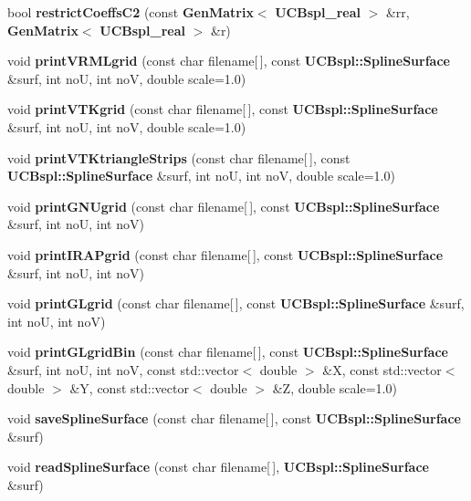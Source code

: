 \begin{DoxyCompactItemize}
\item 
bool {\bfseries restrictCoeffsC2} (const {\bf GenMatrix}$<$ {\bf UCBspl\_\-real} $>$ \&rr, {\bf GenMatrix}$<$ {\bf UCBspl\_\-real} $>$ \&r)\label{namespaceUCBspl_ae8accf3f9377f4347fe10f80c32b90be}

\item 
void {\bfseries printVRMLgrid} (const char filename[$\,$], const {\bf UCBspl::SplineSurface} \&surf, int noU, int noV, double scale=1.0)\label{namespaceUCBspl_a26aaa658f6270a9f2a1b01d16d24c739}

\item 
void {\bfseries printVTKgrid} (const char filename[$\,$], const {\bf UCBspl::SplineSurface} \&surf, int noU, int noV, double scale=1.0)\label{namespaceUCBspl_a179655131a24fee26a950d0cb1f248d2}

\item 
void {\bfseries printVTKtriangleStrips} (const char filename[$\,$], const {\bf UCBspl::SplineSurface} \&surf, int noU, int noV, double scale=1.0)\label{namespaceUCBspl_a067bc3d72fb52bef0916b42b7bac3363}

\item 
void {\bfseries printGNUgrid} (const char filename[$\,$], const {\bf UCBspl::SplineSurface} \&surf, int noU, int noV)\label{namespaceUCBspl_aedaa4d4f380487feddef6f1ae4aadc57}

\item 
void {\bfseries printIRAPgrid} (const char filename[$\,$], const {\bf UCBspl::SplineSurface} \&surf, int noU, int noV)\label{namespaceUCBspl_a64e84c10331f3ad927b20a46246a7c53}

\item 
void {\bfseries printGLgrid} (const char filename[$\,$], const {\bf UCBspl::SplineSurface} \&surf, int noU, int noV)\label{namespaceUCBspl_a190df7bb63ac95282fced52ff1cc1321}

\item 
void {\bfseries printGLgridBin} (const char filename[$\,$], const {\bf UCBspl::SplineSurface} \&surf, int noU, int noV, const std::vector$<$ double $>$ \&X, const std::vector$<$ double $>$ \&Y, const std::vector$<$ double $>$ \&Z, double scale=1.0)\label{namespaceUCBspl_a74ed9ea290da0aef3bf44ab3b245edfb}

\item 
void {\bfseries saveSplineSurface} (const char filename[$\,$], const {\bf UCBspl::SplineSurface} \&surf)\label{namespaceUCBspl_a5ad346ca0d0d9f7394828fc0a64d11bc}

\item 
void {\bfseries readSplineSurface} (const char filename[$\,$], {\bf UCBspl::SplineSurface} \&surf)\label{namespaceUCBspl_ac4c4f0952d5fa76ee63e0d1b683d0516}


\end{DoxyCompactItemize}
